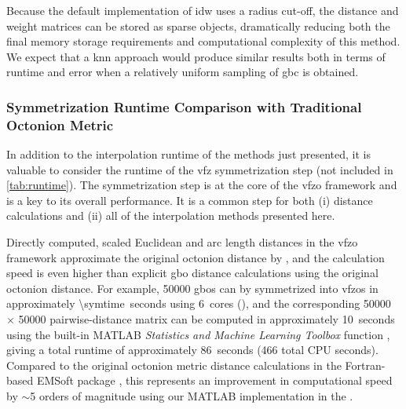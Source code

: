 \documentclass[final,twocolumn,12pt]{elsarticle}
\begin{document}
Because the default implementation of \gls{idw} uses a radius cut-off, the distance and weight matrices can be stored as sparse objects, dramatically reducing both the final memory storage requirements and computational complexity of this method. We expect that a \gls{knn} approach would produce similar results both in terms of runtime and error when a relatively uniform sampling of \gls{gbc} is obtained.

\subsubsection{Symmetrization Runtime Comparison with Traditional Octonion Metric}
\label{sec:results:efficiency:symruntime}
In addition to the interpolation runtime of the methods just presented, it is valuable to consider the runtime of the \gls{vfz} symmetrization step (not included in \cref{tab:runtime}). The symmetrization step is at the core of the \gls{vfzo} framework and is a key to its overall performance. It is a common step for both (i) distance calculations and (ii) all of the interpolation methods presented here. 

Directly computed, scaled Euclidean and arc length distances in the \gls{vfzo} framework approximate the original octonion distance by \citet{francisGeodesicOctonionMetric2019}, and the calculation speed is even higher than explicit \gls{gbo} distance calculations using the original octonion distance. For example, \num{50000} \glspl{gbo} can by symmetrized into \glspl{vfzo} in approximately \SI{\symtime}{seconds} using \SI{6}{cores} (), and the corresponding \num{50000} $\times$ \num{50000} pairwise-distance matrix can be computed in approximately \SI{10}{seconds} using the built-in MATLAB \textit{Statistics and Machine Learning Toolbox} function , giving a total runtime of approximately \SI{86}{seconds} (\num{466} total CPU seconds). Compared to the original octonion metric distance calculations \cite{chesserLearningGrainBoundary2020} in the Fortran-based EMSoft package \cite{degraefEMSoft2020}, this represents an improvement in computational speed by $\sim$\num{5} orders of magnitude using our MATLAB implementation in the \vfzorepo{} \cite{bairdFiveDegreeofFreedom5DOF2020}.
\end{document}
